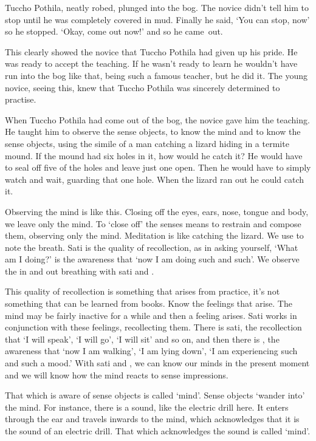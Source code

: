 Tuccho Pothila, neatly robed, plunged into the bog. The novice didn't tell him to stop until he was completely covered in mud. Finally he said, `You can stop, now' so he stopped. `Okay, come out now!' and so he \mbox{came out.} 

This clearly showed the novice that Tuccho Pothila had given up his pride. He was ready to accept the teaching. If he wasn't ready to learn he wouldn't have run into the bog like that, being such a famous teacher, but he did it. The young novice, seeing this, knew that Tuccho Pothila was sincerely determined to practise. 

When Tuccho Pothila had come out of the bog, the novice gave him the teaching. He taught him to observe the sense objects, to know the mind and to know the sense objects, using the simile of a man catching a lizard hiding in a termite mound. If the mound had six holes in it, how would he catch it? He would have to seal off five of the holes and leave just one open. Then he would have to simply watch and wait, guarding that one hole. When the lizard ran out he could catch it. 

Observing the mind is like this. Closing off the eyes, ears, nose, tongue and body, we leave only the mind. To `close off' the senses means to restrain and compose them, observing only the mind. Meditation is like catching the lizard. We use  to note the breath. Sati is the quality of recollection, as in asking yourself, `What am I doing?'  is the awareness that `now I am doing such and such'. We observe the in and out breathing with sati and . 

This quality of recollection is something that arises from practice, it's not something that can be learned from books. Know the feelings that arise. The mind may be fairly inactive for a while and then a feeling arises. Sati works in conjunction with these feelings, recollecting them. There is sati, the recollection that `I will speak', `I will go', `I will sit' and so on, and then there is , the awareness that `now I am walking', `I am lying down', `I am experiencing such and such a mood.' With sati and , we can know our minds in the present moment and we will know how the mind reacts to sense impressions. 

That which is aware of sense objects is called `mind'. Sense objects `wander into' the mind. For instance, there is a sound, like the electric drill here. It enters through the ear and travels inwards to the mind, which acknowledges that it is the sound of an electric drill. That which acknowledges the sound is called `mind'. 

